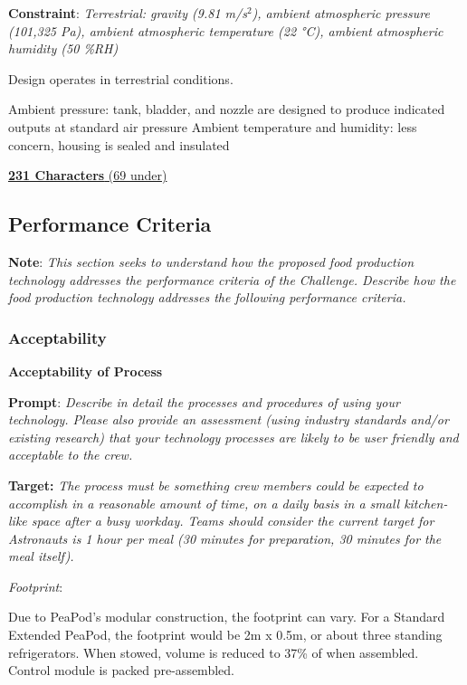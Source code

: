 \documentclass{../tex/report}
\begin{document}
\textbf{Constraint}: \textit{Terrestrial: gravity (9.81 m/s${}^2$), ambient atmospheric pressure (101,325 Pa), ambient atmospheric temperature (22 °C), ambient atmospheric humidity (50 \%RH)}

Design operates in terrestrial conditions.

Ambient pressure: tank, bladder, and nozzle are designed to produce indicated outputs at standard air pressure
Ambient temperature and humidity: less concern, housing is sealed and insulated

\uline{\textbf{231 Characters} (69 under)}

\newpage

\subsection{Performance Criteria}

\textbf{Note}: \textit{This section seeks to understand how the proposed food production technology addresses the performance criteria of the Challenge. Describe how the food production technology addresses the following performance criteria.}

\subsubsection{Acceptability}
\label{sec:acceptability}

\textbf{Acceptability of Process}
\label{sec:acceptability-process}

\textbf{Prompt}: \textit{Describe in detail the processes and procedures of using your technology. Please also provide an assessment (using industry standards and/or existing research) that your technology processes are likely to be user friendly and acceptable to the crew.}

\textbf{Target:} \textit{The process must be something crew members could be expected to accomplish in a reasonable amount of time, on a daily basis in a small kitchen-like space after a busy workday. Teams should consider the current target for Astronauts is 1 hour per meal (30 minutes for preparation, 30 minutes for the meal itself).}


\textit{Footprint}:

Due to PeaPod's modular construction, the footprint can vary. For a Standard Extended PeaPod, the footprint would be 2m x 0.5m, or about three standing refrigerators. When stowed, volume is reduced to 37\% of when assembled. Control module is packed pre-assembled.
\end{document}
